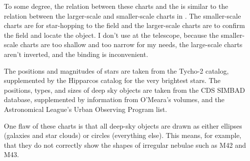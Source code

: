 To some degree, the relation between these charts and the {\PSA} is similar to the relation between the larger-scale and smaller-scale charts in . The smaller-scale charts are for star-hopping to the field and the larger-scale charts are to confirm the field and locate the object. I don’t use  at the telescope, because the smaller-scale charts are too shallow and too narrow for my needs, the large-scale charts aren’t inverted, and the binding is inconvenient.

\bigskip

The positions and magnitudes of stars are taken from the Tycho-2 catalog, supplemented by the Hipparcos catalog for the very brightest stars. The positions, types, and sizes of deep sky objects are taken from the CDS SIMBAD database, supplemented by information from O’Meara’s  volumes, and the Astronomical League’s Urban Observing Program list.

\bigskip

One flaw of these charts is that all deep-sky objects are drawn as either ellipses (galaxies and star clouds) or circles (everything else). This means, for example, that they do not correctly show the shapes of irregular nebulae such as M42 and M43.

